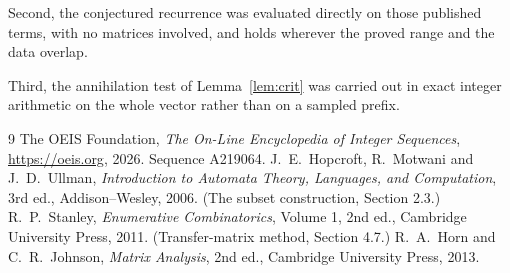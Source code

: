\documentclass[11pt,a4paper]{article}
\theoremstyle{plain}
\theoremstyle{definition}
\begin{document}
Second, the conjectured recurrence was evaluated directly on those published terms, with no
matrices involved, and holds wherever the proved range and the data overlap.

Third, the annihilation test of Lemma~\ref{lem:crit} was carried out in exact integer
arithmetic on the whole vector rather than on a sampled prefix.

\begin{thebibliography}{9}
 The OEIS Foundation, \emph{The On-Line Encyclopedia of Integer
Sequences}, \url{https://oeis.org}, 2026. Sequence A219064.
 J.~E.~Hopcroft, R.~Motwani and J.~D.~Ullman, \emph{Introduction to Automata
Theory, Languages, and Computation}, 3rd ed., Addison--Wesley, 2006. (The subset
construction, Section 2.3.)
 R.~P.~Stanley, \emph{Enumerative Combinatorics}, Volume 1, 2nd ed.,
Cambridge University Press, 2011. (Transfer-matrix method, Section 4.7.)
 R.~A.~Horn and C.~R.~Johnson, \emph{Matrix Analysis}, 2nd ed., Cambridge
University Press, 2013.
\end{thebibliography}
\end{document}

